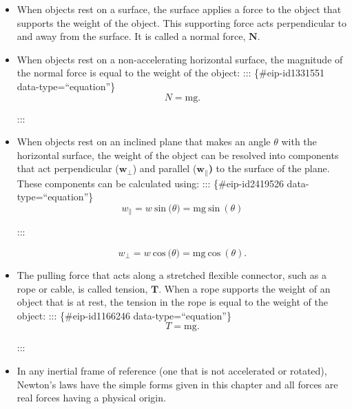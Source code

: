 \documentclass[
]{book}
\begin{document}
\begin{itemize}
\item
  When objects rest on a surface, the surface applies a force to the
  object that supports the weight of the object. This supporting force
  acts perpendicular to and away from the surface. It is called a
  normal force, \(\textbf{N}{}\).
\item
  When objects rest on a non-accelerating horizontal surface, the
  magnitude of the normal force is equal to the weight of the object:
  ::: \{\#eip-id1331551 data-type=``equation''\}
  \[{N = \text{mg}}.\]

  :::
\item
  When objects rest on an inclined plane that makes an angle
  \(\theta{}\) with the horizontal surface, the weight of the object can
  be resolved into components that act perpendicular
  (\(\textbf{w}_{\bot}{}\)) and parallel
  (\(\textbf{w}_{\parallel}{}\)\textbf{)} to the surface of the plane. These
  components can be calculated using:
  ::: \{\#eip-id2419526 data-type=``equation''\}
  \[{{w_{\parallel} = w\ }\text{sin}\ (\theta{) = \text{mg}}\ \text{sin}\ (\theta)}{}\]

  :::

  \leavevmode\hypertarget{eip-id1949783}{}%
  \[{{w_{\bot} = w}\ \text{cos}\ (\theta{) = {\text{mg}\ }}\text{cos}\ (\theta)}.\]
\item
  The pulling force that acts along a stretched flexible connector,
  such as a rope or cable, is called tension, \(\textbf{T}{}\). When a
  rope supports the weight of an object that is at rest, the tension
  in the rope is equal to the weight of the object:
  ::: \{\#eip-id1166246 data-type=``equation''\}
  \[{T = \text{mg}}.\]

  :::
\item
  In any inertial frame of reference (one that is not accelerated or
  rotated), Newton's laws have the simple forms given in this chapter
  and all forces are real forces having a physical origin.
\end{itemize}
\end{document}
